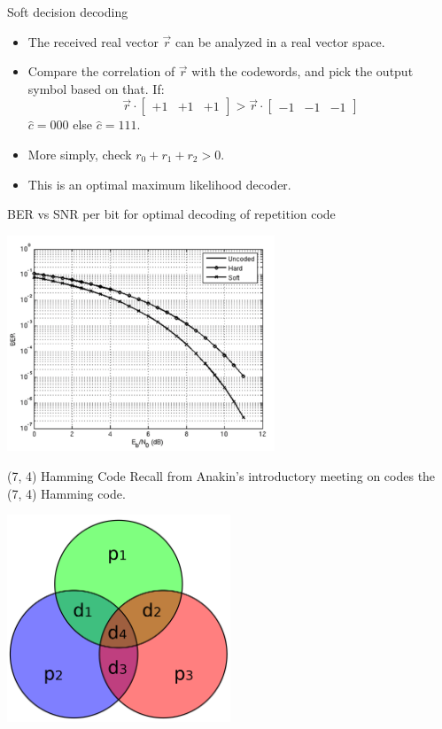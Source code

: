 \documentclass[aspectratio=1610, 10pt]{beamer}
\begin{document}
\begin{frame}[label={sec:org8cc8c79}]{Soft decision decoding}
\begin{itemize}
\item The received real vector \(\vec{r}\) can be analyzed in a real vector
space.
\item Compare the correlation of \(\vec{r}\) with the codewords, and pick
the output symbol based on that. If:
$$\vec{r} \cdot \begin{bmatrix} +1 & +1 & +1 \end{bmatrix} > \vec{r}
  \cdot  \begin{bmatrix} -1 & -1 & -1 \end{bmatrix}$$
\(\hat{c} = 000\) else \(\hat{c} = 111\).
\item More simply, check \(r_0 + r_1 + r_2 > 0\).
\item This is an optimal \alert{maximum likelihood decoder}.
\end{itemize}
\end{frame}

\begin{frame}[label={sec:orgd350f0d}]{BER vs SNR per bit for optimal decoding of repetition code}
\begin{center}
\includegraphics[width=0.6\textwidth]{./repetition_soft_ber_snr.png}
\end{center}
\end{frame}

\begin{frame}[label={sec:org72826eb}]{(7, 4) Hamming Code}
Recall from Anakin's introductory meeting on codes the (7, 4)
Hamming code.

\begin{center}
\includegraphics[width=0.5\textwidth]{./hamming74.png}
\end{center}
\end{frame}
\end{document}
